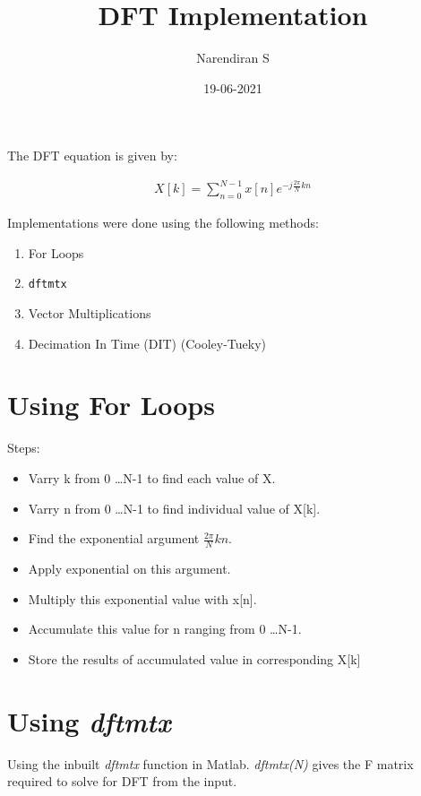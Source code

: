 \documentclass{article}
\title{DFT Implementation}
\author{Narendiran S}
\date{19-06-2021}
\begin{document}
\Large
\maketitle

The DFT equation is given by:

\begin{align*}
    X[k] = \sum_{n=0}^{N-1} x[n] e^{-j\frac{2\pi}{N} k n}
\end{align*}


Implementations were done using the following methods:

\begin{enumerate}[label=\alph*)]
    \item For Loops
    \item \verb|dftmtx|
    \item Vector Multiplications
    \item Decimation In Time (DIT) (Cooley-Tueky)
\end{enumerate}


\section{Using For Loops}
Steps:
\begin{itemize}
    \item Varry k from 0 \dots N-1 to find each value of X.
    \item Varry n from 0 \dots N-1  to find individual value of X[k].
    \item Find the exponential argument $\frac{2\pi}{N} k n$.
    \item Apply exponential on this argument.
    \item Multiply this exponential value with x[n].
    \item Accumulate this value for n ranging from  0 \dots N-1.
    \item Store the results of accumulated value in corresponding X[k]
\end{itemize}

\section{Using \emph{dftmtx}}
Using the inbuilt \emph{dftmtx} function in Matlab.
\emph{dftmtx(N)} gives the F matrix required to solve for DFT from the input.
\end{document}

